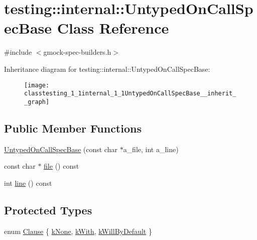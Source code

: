 \hypertarget{classtesting_1_1internal_1_1UntypedOnCallSpecBase}{}\section{testing\+:\+:internal\+:\+:Untyped\+On\+Call\+Spec\+Base Class Reference}
\label{classtesting_1_1internal_1_1UntypedOnCallSpecBase}


{\ttfamily \#include $<$gmock-\/spec-\/builders.\+h$>$}



Inheritance diagram for testing\+:\+:internal\+:\+:Untyped\+On\+Call\+Spec\+Base\+:\nopagebreak
\begin{figure}[H]
\begin{center}
\leavevmode
\texttt{[image: classtesting\_1\_1internal\_1\_1UntypedOnCallSpecBase\_\_inherit\_\_graph]}
\end{center}
\end{figure}
\subsection*{Public Member Functions}
\begin{DoxyCompactItemize}
\item 
\hyperlink{classtesting_1_1internal_1_1UntypedOnCallSpecBase_afc5da72d536ad61e2d66de87b2b9bc50}{Untyped\+On\+Call\+Spec\+Base} (const char $\ast$a\+\_\+file, int a\+\_\+line)
\item 
const char $\ast$ \hyperlink{classtesting_1_1internal_1_1UntypedOnCallSpecBase_ae4cb8eb6aa409a4b29a8cc12ec46c5c4}{file} () const 
\item 
int \hyperlink{classtesting_1_1internal_1_1UntypedOnCallSpecBase_a6cabf881d2cae1e270528a823f7d9f7e}{line} () const 
\end{DoxyCompactItemize}
\subsection*{Protected Types}
\begin{DoxyCompactItemize}
\item 
enum \hyperlink{classtesting_1_1internal_1_1UntypedOnCallSpecBase_a78ebf16bfee40375e33a983f3100f354}{Clause} \{ \hyperlink{classtesting_1_1internal_1_1UntypedOnCallSpecBase_a78ebf16bfee40375e33a983f3100f354a57f312c5eacf22518ff0b12405cde4f1}{k\+None}, 
\hyperlink{classtesting_1_1internal_1_1UntypedOnCallSpecBase_a78ebf16bfee40375e33a983f3100f354a451699b0beaaabb325f8eaf1c65a071d}{k\+With}, 
\hyperlink{classtesting_1_1internal_1_1UntypedOnCallSpecBase_a78ebf16bfee40375e33a983f3100f354aeb25a21e1aa3dc4ca3a108b5533d7eed}{k\+Will\+By\+Default}
 \}
\end{DoxyCompactItemize}
